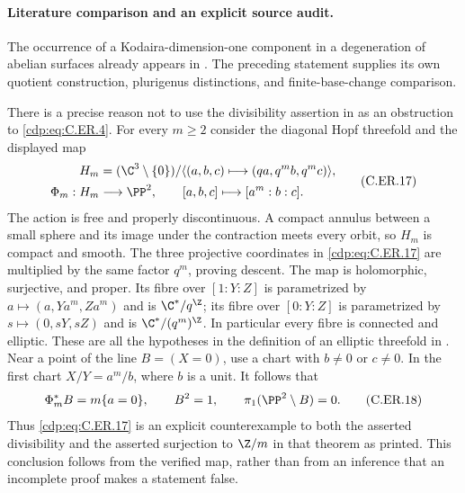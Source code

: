 \paragraph{Literature comparison and an explicit source audit.}
The occurrence of a Kodaira-dimension-one component in a degeneration
of abelian surfaces already appears in
\cite[Example~3.4(1), p.~99]{Fujimoto1988Log}.
The preceding statement supplies its own quotient construction,
plurigenus distinctions, and finite-base-change comparison.

There is a precise reason not to use the divisibility assertion in
\cite[Theorem~2.8 and Corollary~2.10, pp.~96--97]{Fujimoto1988Log}
as an obstruction to \eqref{cdp:eq:C.ER.4}. For every $m\ge2$ consider the
diagonal Hopf threefold and the displayed map
\[
 \begin{split}
 H_m&=(\C^3\setminus\{0\})/
       \langle(a,b,c)\longmapsto(qa,q^m b,q^m c)\rangle,\\
 \Phi_m:H_m&\longrightarrow\PP^2,
       \qquad[a,b,c]\longmapsto[a^m:b:c].
 \end{split}                                             \tag{C.ER.17}\label{cdp:eq:C.ER.17}
\]
The action is free and properly discontinuous. A compact annulus
between a small sphere and its image under the contraction meets every
orbit, so $H_m$ is compact and smooth. The three projective coordinates
in \eqref{cdp:eq:C.ER.17} are multiplied by the same factor $q^m$, proving descent.
The map is holomorphic, surjective, and proper. Its fibre over
$[1:Y:Z]$ is parametrized by
$a\mapsto(a,Ya^m,Za^m)$ and is $\C^*/q^{\Z}$; its fibre over
$[0:Y:Z]$ is parametrized by
$s\mapsto(0,sY,sZ)$ and is $\C^*/(q^m)^{\Z}$.
In particular every fibre is connected and elliptic. These are all
the hypotheses in the definition of an elliptic threefold in
\cite[pp.~91--92]{Fujimoto1988Log}.
Near a point of the line $B=(X=0)$, use a chart with $b\ne0$ or
$c\ne0$. In the first chart $X/Y=a^m/b$, where $b$ is a unit.
It follows that
\[
             \Phi_m^*B=m\{a=0\},\qquad B^2=1,
             \qquad\pi_1(\PP^2\setminus B)=0.             \tag{C.ER.18}\label{cdp:eq:C.ER.18}
\]
Thus \eqref{cdp:eq:C.ER.17} is an explicit counterexample to both the asserted
divisibility and the asserted surjection to $\Z/m$ in that theorem
as printed. This conclusion follows from the verified map, rather
than from an inference that an incomplete proof makes a statement
false.

